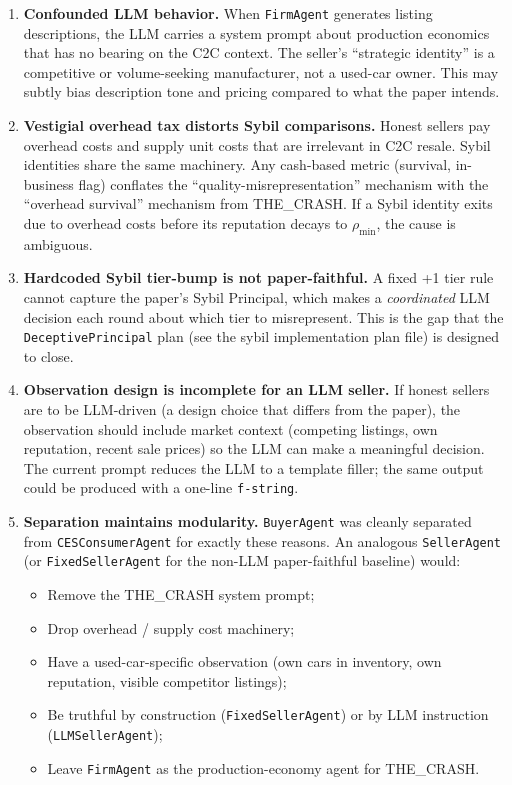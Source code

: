 \documentclass{article}
\begin{document}
\begin{enumerate}
  \item \textbf{Confounded LLM behavior.} When \texttt{FirmAgent} generates listing descriptions,
    the LLM carries a system prompt about production economics that has no bearing on
    the C2C context. The seller's ``strategic identity'' is a competitive or volume-seeking
    manufacturer, not a used-car owner. This may subtly bias description tone and pricing
    compared to what the paper intends.

  \item \textbf{Vestigial overhead tax distorts Sybil comparisons.} Honest sellers pay overhead
    costs and supply unit costs that are irrelevant in C2C resale. Sybil identities share the
    same machinery. Any cash-based metric (survival, in-business flag) conflates the
    ``quality-misrepresentation'' mechanism with the ``overhead survival'' mechanism
    from THE\_CRASH. If a Sybil identity exits due to overhead costs before its reputation
    decays to $\rho_{\min}$, the cause is ambiguous.

  \item \textbf{Hardcoded Sybil tier-bump is not paper-faithful.} A fixed +1 tier rule cannot
    capture the paper's Sybil Principal, which makes a \emph{coordinated} LLM decision each
    round about which tier to misrepresent. This is the gap that the \texttt{DeceptivePrincipal}
    plan (see the sybil implementation plan file) is designed to close.

  \item \textbf{Observation design is incomplete for an LLM seller.} If honest sellers are to
    be LLM-driven (a design choice that differs from the paper), the observation should
    include market context (competing listings, own reputation, recent sale prices) so the
    LLM can make a meaningful decision. The current prompt reduces the LLM to a template
    filler; the same output could be produced with a one-line \texttt{f-string}.

  \item \textbf{Separation maintains modularity.} \texttt{BuyerAgent} was cleanly separated from
    \texttt{CESConsumerAgent} for exactly these reasons. An analogous \texttt{SellerAgent}
    (or \texttt{FixedSellerAgent} for the non-LLM paper-faithful baseline) would:
    \begin{itemize}
      \item Remove the THE\_CRASH system prompt;
      \item Drop overhead / supply cost machinery;
      \item Have a used-car-specific observation (own cars in inventory, own reputation,
        visible competitor listings);
      \item Be truthful by construction (\texttt{FixedSellerAgent}) or by LLM instruction
        (\texttt{LLMSellerAgent});
      \item Leave \texttt{FirmAgent} as the production-economy agent for THE\_CRASH.
    \end{itemize}
\end{enumerate}
\end{document}
